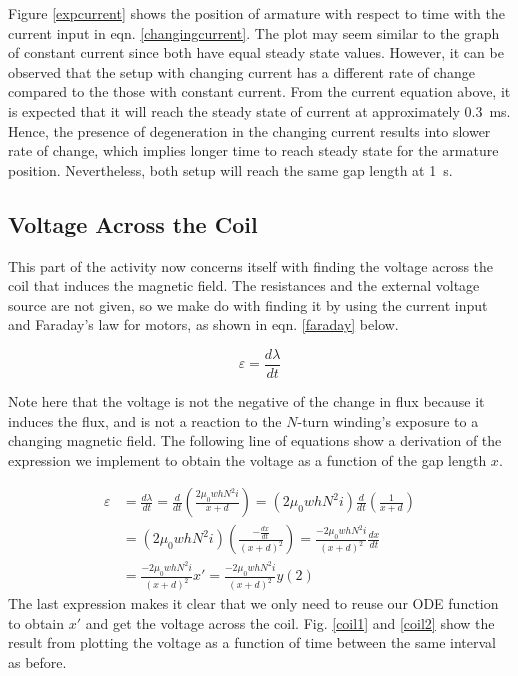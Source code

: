 \documentclass[conference]{IEEEtran}
\begin{document}
Figure \ref{expcurrent} shows the position of armature with respect to time with the current input in eqn. \eqref{changingcurrent}. The plot may seem similar to the graph of constant current since both have equal steady state values. However, it can be observed that the setup with changing current has a different rate of change compared to the those with constant current. From the current equation above, it is expected that it will reach the steady state of current at approximately \SI{0.3}{\milli\second}. Hence, the presence of degeneration in the changing current results into slower rate of change, which implies longer time to reach steady state for the armature position. Nevertheless, both setup will reach the same gap length at \SI{1}{\second}.

\subsection{Voltage Across the Coil}

This part of the activity now concerns itself with finding the voltage across the coil that induces the magnetic field. The resistances and the external voltage source are not given, so we make do with finding it by using the current input and Faraday's law for motors, as shown in eqn. \eqref{faraday} below.

\begin{equation} \label{faraday}
    \varepsilon = \frac{d\lambda}{dt}
\end{equation}

Note here that the voltage is not the negative of the change in flux because it induces the flux, and is not a reaction to the $N$-turn winding's exposure to a changing magnetic field. The following line of equations show a derivation of the expression we implement to obtain the voltage as a function of the gap length $x$.

\begin{align*}
    \varepsilon &= \frac{d\lambda}{dt} = \frac{d}{dt}\left( \frac{2\mu_{0} wh N^{2}i}{x+d} \right)= (2\mu_{0} wh N^{2}i) \frac{d}{dt} \left( \frac{1}{x+d} \right) \\
    & = (2\mu_{0} wh N^{2}i) \left( \frac{-\frac{dx}{dt}}{(x+d)^{2}} \right) = \frac{-2\mu_{0} wh N^{2}i}{(x+d)^{2}}\frac{dx}{dt} \\
    & = \frac{-2\mu_{0} wh N^{2}i}{(x+d)^{2}}x' = \frac{-2\mu_{0} wh N^{2}i}{(x+d)^{2}}y(2)
\end{align*}
The last expression makes it clear that we only need to reuse our ODE function to obtain $x'$ and get the voltage across the coil. Fig. \ref{coil1} and \ref{coil2} show the result from plotting the voltage as a function of time between the same interval as before.
\end{document}
